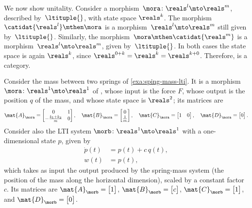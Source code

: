 \begin{solution}
    We now show unitality.
    Consider a morphism~$\mora\colon \reals^l\mto \reals^m$, described by~$\ltituple{}$, with state space $\reals^k$.
    The morphism~$\catidat{\reals^l} \mthen \mora$ is a morphism~$\reals^l\mto \reals^m$ still given by~$\ltituple{}$.
    Similarly, the morphism~$\mora\mthen \catidat{\reals^m}$ is a morphism~$\reals^l\mto \reals^m$, given by~$\ltituple{}$.
    In both cases the state space is again $\reals^k$, since $\reals^{0+k} = \reals^k = \reals^{k+0}$.
    Therefore, \LTI is a category.
\end{solution}

\begin{example}
    \label{exa:lti-composition-spring-mass}
    Consider the mass between two springs of \cref{exa:sping-mass-lti}.
    It is a morphism $\mora \colon \reals^1 \mto \reals^1$ of \LTI, whose input is the force $F$, whose output is the position $q$ of the mass, and whose state space is $\reals^2$; its matrices are
    \begin{equation*}
        \mat{A}_\mora=\begin{bmatrix}0                  & 1 \\
               -\frac{k_1+k_2}{m} & 0\end{bmatrix},\quad
        \mat{B}_\mora=\begin{bmatrix}
            0 \\
            \frac{1}{m}
        \end{bmatrix},
        \quad
        \mat{C}_\mora=\begin{bmatrix}
            1 & 0
        \end{bmatrix},
        \quad
        \mat{D}_\mora=\begin{bmatrix}
            0
        \end{bmatrix}.
    \end{equation*}
    Consider also the LTI system $\morb \colon \reals^1 \mto \reals^1$ with a one-dimensional state $p$, given by
    \begin{equation*}
        \begin{aligned}
            \dot{p}(t) & =p(t)+c\,q(t), \\
            w(t)       & =p(t),
        \end{aligned}
    \end{equation*}
    which takes as input the output produced by the spring-mass system (the position of the mass along the horizontal dimension), scaled by a constant factor $c$.
    Its matrices are $\mat{A}_\morb = \begin{bmatrix} 1 \end{bmatrix}$, $\mat{B}_\morb = \begin{bmatrix} c \end{bmatrix}$, $\mat{C}_\morb = \begin{bmatrix} 1 \end{bmatrix}$, and $\mat{D}_\morb = \begin{bmatrix} 0 \end{bmatrix}$.


\end{example}
